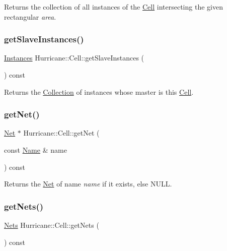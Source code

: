 Returns the collection of all instances of the \mbox{\hyperlink{classHurricane_1_1Cell}{Cell}} intersecting the given rectangular {\itshape area}. \mbox{\label{classHurricane_1_1Cell_a7e51bee5db73dd44f788e591a5c175c8}} 
\subsubsection{\texorpdfstring{get\+Slave\+Instances()}{getSlaveInstances()}}
{\footnotesize\ttfamily \mbox{\hyperlink{namespaceHurricane_ac9436b03a2926f34ad6863deae2baadc}{Instances}} Hurricane\+::\+Cell\+::get\+Slave\+Instances (\begin{DoxyParamCaption}{ }\end{DoxyParamCaption}) const}

Returns the \mbox{\hyperlink{classHurricane_1_1Collection}{Collection}} of instances whose master is this \mbox{\hyperlink{classHurricane_1_1Cell}{Cell}}. \mbox{\label{classHurricane_1_1Cell_a63cb19881279b5af0a4e7dae707ef1bd}} 
\subsubsection{\texorpdfstring{get\+Net()}{getNet()}}
{\footnotesize\ttfamily \mbox{\hyperlink{classHurricane_1_1Net}{Net}} $\ast$ Hurricane\+::\+Cell\+::get\+Net (\begin{DoxyParamCaption}\item[{const \mbox{\hyperlink{classHurricane_1_1Name}{Name}} \&}]{name }\end{DoxyParamCaption}) const}

Returns the \mbox{\hyperlink{classHurricane_1_1Net}{Net}} of name {\itshape name} if it exists, else {\ttfamily N\+U\+LL}. \mbox{\label{classHurricane_1_1Cell_a8b4728abe83e9ec21d7bee1154218279}} 
\subsubsection{\texorpdfstring{get\+Nets()}{getNets()}}
{\footnotesize\ttfamily \mbox{\hyperlink{namespaceHurricane_a3404a8b17130a1824f4a281704b04df7}{Nets}} Hurricane\+::\+Cell\+::get\+Nets (\begin{DoxyParamCaption}{ }\end{DoxyParamCaption}) const\hspace{0.3cm}{\ttfamily [inline]}}

